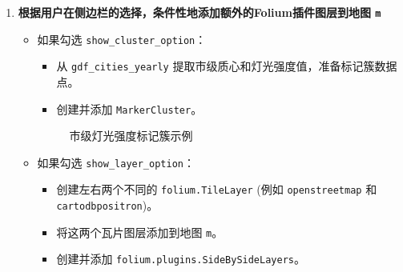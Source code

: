 \documentclass[14pt,a4paper,UTF8,twoside]{article}
\begin{document}
\begin{enumerate}
    \item \textbf{根据用户在侧边栏的选择，条件性地添加额外的Folium插件图层到地图 \texttt{m}}
        \begin{itemize}
            \item 如果勾选 \texttt{show\_cluster\_option}：
                \begin{itemize}
                    \item 从 \texttt{gdf\_cities\_yearly} 提取市级质心和灯光强度值，准备标记簇数据点。
                    \item 创建并添加 \texttt{MarkerCluster}。
                \end{itemize}
                \begin{figure}[H]
                    \centering
                    \caption{市级灯光强度标记簇示例}
                    \label{fig:marker_cluster_example}
                \end{figure}
            \item 如果勾选 \texttt{show\_layer\_option}：
                \begin{itemize}
                    \item 创建左右两个不同的 \texttt{folium.TileLayer} (例如 \texttt{openstreetmap} 和 \texttt{cartodbpositron})。
                    \item 将这两个瓦片图层添加到地图 \texttt{m}。
                    \item 创建并添加 \texttt{folium.plugins.SideBySideLayers}。
                \end{itemize}
                \begin{figure}[H]
                    \centering

\end{figure}
\end{itemize}
\end{enumerate}
\end{document}
